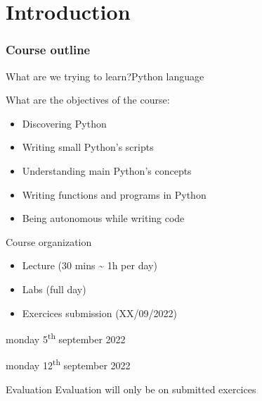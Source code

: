 
\part{Introduction}

\section{Course outline}

\begin{frame}{What are we trying to learn?}{Python language}

  What are the objectives of the course:
  \begin{itemize}
    \item Discovering Python  %
    \item Writing small Python's scripts  %
    \item Understanding main Python's concepts  %
    \item Writing functions and programs in Python  %
    \item Being autonomous while writing code  %
  \end{itemize}

\end{frame}


\begin{frame}{Course organization}

  \begin{itemize}
    \item<1-> Lecture (30 mins \textasciitilde{} 1h per day)
    \item<2-> Labs (full day)
    \item<3-> Exercices submission (XX/09/2022)
  \end{itemize}

  \medskip

  \begin{center}

     monday 5\textsuperscript{th} september 2022

     monday 12\textsuperscript{th} september 2022

  \end{center}


   \begin{block}{Evaluation}
	Evaluation will only be on submitted exercices
  \end{block}

\end{frame}
